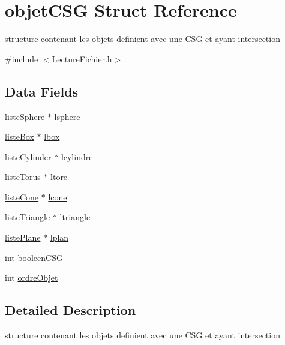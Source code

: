 \hypertarget{structobjet_c_s_g}{
\section{objetCSG Struct Reference}
\label{structobjet_c_s_g}
}


structure contenant les objets definient avec une CSG et ayant intersection  




{\ttfamily \#include $<$LectureFichier.h$>$}

\subsection*{Data Fields}
\begin{DoxyCompactItemize}
\item 
\hyperlink{structliste_sphere}{listeSphere} $\ast$ \hyperlink{structobjet_c_s_g_ad6fc54edaae24f34f8093b277a3b2d04}{lsphere}
\item 
\hyperlink{structliste_box}{listeBox} $\ast$ \hyperlink{structobjet_c_s_g_a5b7114d3e4c7527479db2477acc69180}{lbox}
\item 
\hyperlink{structliste_cylinder}{listeCylinder} $\ast$ \hyperlink{structobjet_c_s_g_a28b52bc13fd24dcd25e9e9d6c073ee97}{lcylindre}
\item 
\hyperlink{structliste_torus}{listeTorus} $\ast$ \hyperlink{structobjet_c_s_g_a47505e910fde32e049a2e94ad84b48c0}{ltore}
\item 
\hyperlink{structliste_cone}{listeCone} $\ast$ \hyperlink{structobjet_c_s_g_aa328f20993d25abe873904ada1aadad0}{lcone}
\item 
\hyperlink{structliste_triangle}{listeTriangle} $\ast$ \hyperlink{structobjet_c_s_g_aa64fa005027990999edeea5037673d45}{ltriangle}
\item 
\hyperlink{structliste_plane}{listePlane} $\ast$ \hyperlink{structobjet_c_s_g_a6c0864a0bbb65be0c48b341061498fd9}{lplan}
\item 
int \hyperlink{structobjet_c_s_g_a4428e32d4383f7dee25e5a4cb192da24}{booleenCSG}
\item 
int \hyperlink{structobjet_c_s_g_a0f0df060d7b66c7333474d2fae92dbed}{ordreObjet}
\end{DoxyCompactItemize}


\subsection{Detailed Description}
structure contenant les objets definient avec une CSG et ayant intersection 

